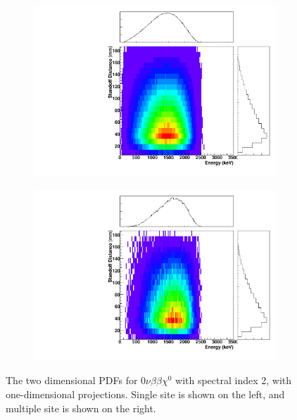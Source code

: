 \documentclass[herrin-thesis.tex]{subfiles}
\begin{document}
\begin{figure}[hp]
\centering
	\begin{subfigure}[b]{0.48\textwidth}
	\centering
	\includegraphics[width=\textwidth]{./plots/PDFs/analysis_pdf_bb0nX2_ss.pdf}
\end{subfigure}\hfill%
\begin{subfigure}[b]{0.48\textwidth}
	\centering
	\includegraphics[width=1\textwidth]{./plots/PDFs/analysis_pdf_bb0nX2_ms.pdf}
	\end{subfigure}
\caption[PDF for \(0\nu\beta\beta\chi^{0}\)]{The two dimensional PDFs for \(0\nu\beta\beta\chi^{0}\) with spectral index 2, with one-dimensional projections. Single site is shown on the left, and multiple site is shown on the right.}
\label{fig:analysis_pdf_bb0nX2}
\end{figure}
\end{document}
